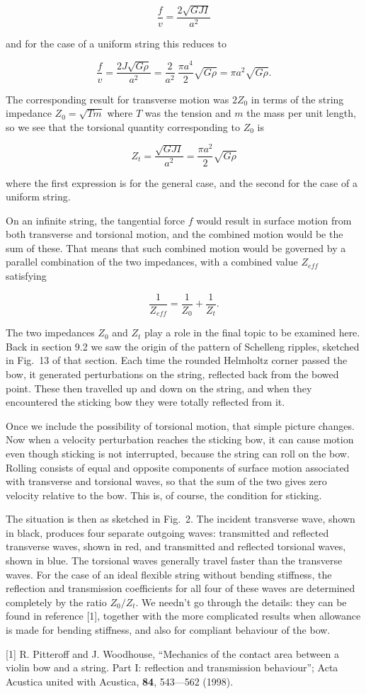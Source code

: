   $$\dfrac{f}{v}=\dfrac{2 \sqrt{GJI}}{a^2} \tag{10}$$ 

  and for the case of a uniform string this reduces to 

  $$\dfrac{f}{v}=\dfrac{2 J\sqrt{G\rho}}{a^2}=\dfrac{2}{a^2}~\dfrac{\pi a^4}{2} 
  \sqrt{G \rho}=\pi a^2 \sqrt{G\rho} . \tag{11}$$ 

  The corresponding result for transverse motion was $2 Z_0$ in terms of the 
  string impedance $Z_0=\sqrt{T m}$ where $T$ was the tension and $m$ the mass 
  per unit length, so we see that the torsional quantity corresponding to $Z_0$ 
  is 

  $$Z_t=\dfrac{\sqrt{GJI}}{a^2}=\dfrac{\pi a^2}{2} \sqrt{G\rho} \tag{12}$$ 

  where the first expression is for the general case, and the second for the 
  case of a uniform string. 

  On an infinite string, the tangential force $f$ would result in surface 
  motion from both transverse and torsional motion, and the combined motion 
  would be the sum of these. That means that such combined motion would be 
  governed by a parallel combination of the two impedances, with a combined 
  value $Z_{eff}$ satisfying 

  $$\dfrac{1}{Z_{eff}}=\dfrac{1}{Z_0}+\dfrac{1}{Z_t} . \tag{13}$$ 

  The two impedances $Z_0$ and $Z_t$ play a role in the final topic to be 
  examined here. Back in section 9.2 we saw the origin of the pattern of 
  Schelleng ripples, sketched in Fig.\ 13 of that section. Each time the 
  rounded Helmholtz corner passed the bow, it generated perturbations on the 
  string, reflected back from the bowed point. These then travelled up and down 
  on the string, and when they encountered the sticking bow they were totally 
  reflected from it. 

  Once we include the possibility of torsional motion, that simple picture 
  changes. Now when a velocity perturbation reaches the sticking bow, it can 
  cause motion even though sticking is not interrupted, because the string can 
  roll on the bow. Rolling consists of equal and opposite components of surface 
  motion associated with transverse and torsional waves, so that the sum of the 
  two gives zero velocity relative to the bow. This is, of course, the 
  condition for sticking. 

  The situation is then as sketched in Fig.\ 2. The incident transverse wave, 
  shown in black, produces four separate outgoing waves: transmitted and 
  reflected transverse waves, shown in red, and transmitted and reflected 
  torsional waves, shown in blue. The torsional waves generally travel faster 
  than the transverse waves. For the case of an ideal flexible string without 
  bending stiffness, the reflection and transmission coefficients for all four 
  of these waves are determined completely by the ratio $Z_0/Z_t$. We needn't 
  go through the details: they can be found in reference [1], together with the 
  more complicated results when allowance is made for bending stiffness, and 
  also for compliant behaviour of the bow. 

  \sectionreferences{}[1] R. Pitteroff and J. Woodhouse, “Mechanics of the 
  contact area between a violin bow and a string. Part I: reflection and 
  transmission behaviour”; Acta Acustica united with Acustica, \textbf{84}, 
  543—562 (1998). 